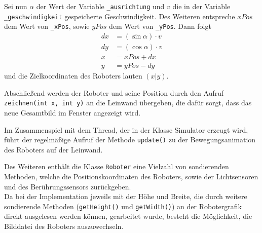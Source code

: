 \documentclass[paper=a4, DIV=calc, BCOR=12mm, twoside=on, onecolumn=on, open = right, titlepage =on, parskip =half-, headsepline = on, footsepline = off, chapterprefix = off, appendixprefix = on, fontsize = 12pt, numbers = noenddot, abstract = on]{scrbook}
\begin{document}
Sei nun $\alpha$ der Wert der Variable \texttt{{\_}ausrichtung} und $v$ die in der Variable \texttt{{\_}ge\-schwin\-dig\-keit} gespeicherte Geschwindigkeit. Des Weiteren entspreche $xPos$ dem Wert von \texttt{{\_}xPos}, sowie $yPos$ dem Wert von \texttt{{\_}yPos}. Dann folgt
\begin{align*}
dx & = \left( \sin \alpha \right) \cdot v\\
dy & = \left( \cos \alpha \right) \cdot v\\
x & = xPos + dx\\
y & = yPos - dy
\end{align*}
und die Zielkoordinaten des Roboters lauten $\left( x \vert y \right)$.

Abschließend werden der Roboter und seine Position durch den Aufruf \texttt{zeich\-nen(int x, int y)} an die Leinwand übergeben, die dafür sorgt, dass das neue Gesamtbild im Fenster angezeigt wird.

Im Zusammenspiel mit dem Thread, der in der Klasse Simulator erzeugt wird, führt der regelmäßige Aufruf der Methode \texttt{update()} zu der Bewegungsanimation des Roboters auf der Leinwand.


Des Weiteren enthält die Klasse \texttt{Roboter} eine Vielzahl von sondierenden Methoden, welche die Positionskoordinaten des Roboters, sowie der Lichtsensoren und des Berührungssensors zurückgeben.\\
Da bei der Implementation jeweils mit der Höhe und Breite, die durch weitere sondierende Methoden (\texttt{getHeight()} und \texttt{getWidth()}) an der Robotergrafik direkt ausgelesen werden können, gearbeitet wurde, besteht die Möglichkeit, die Bilddatei des Roboters auszuwechseln.
\end{document}
